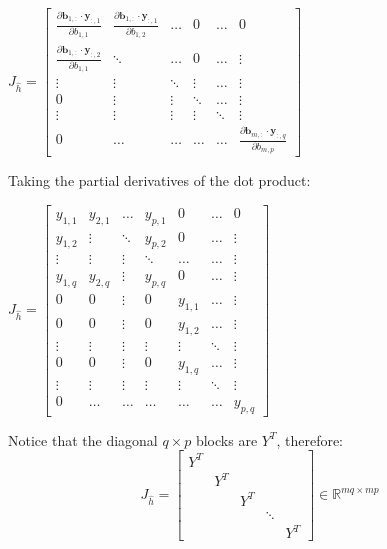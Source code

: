 \documentclass{article}
\begin{document}
\begin{center}$
J_{\widehat{h}}
=
\begin{bmatrix}
    \frac{\partial \mathbf{b}_{1,:} \cdot \mathbf{y}_{:,1} }{\partial b_{1,1}} & \frac{\partial \mathbf{b}_{1,:} \cdot \mathbf{y}_{:,1} }{\partial b_{1,2}} &\hdots &  0 &\hdots & 0 \\
    \frac{\partial \mathbf{b}_{1,:} \cdot \mathbf{y}_{:,2} }{\partial b_{1,1}}  & \ddots &\hdots & 0 & \hdots& \vdots \\
    \vdots & \vdots & \ddots & \vdots & \hdots & \vdots\\
    0 & \vdots & \vdots & \ddots & \hdots & \vdots\\
    \vdots & \vdots & \vdots & \vdots & \ddots & \vdots\\
    0  & \hdots & \hdots & \hdots & \hdots & \frac{\partial \mathbf{b}_{m,:} \cdot \mathbf{y}_{:,q} }{\partial b_{m,p}}
\end{bmatrix}
$
\end{center}
Taking the partial derivatives of the dot product:
\begin{center}$
J_{\widehat{h}}
=
\begin{bmatrix}
    y_{1,1} & y_{2,1} &\hdots & y_{p,1}&  0 &\hdots & 0 \\
    y_{1,2}  & \vdots &\ddots  &y_{p,2}&0& \hdots& \vdots \\
    \vdots &\vdots& \vdots & \ddots & \hdots & \hdots & \vdots\\
    y_{1,q} & y_{2,q} & \vdots & y_{p,q}& 0 & \hdots & \vdots\\
    0& 0 & \vdots & 0& y_{1,1} & \hdots & \vdots\\
    0 & 0 & \vdots & 0& y_{1,2} & \hdots & \vdots\\
    \vdots&\vdots & \vdots & \vdots & \vdots & \ddots & \vdots\\
    0 & 0 & \vdots & 0& y_{1,q} & \hdots & \vdots\\
    \vdots&\vdots & \vdots & \vdots & \vdots & \ddots & \vdots\\
    0  &\hdots& \hdots & \hdots & \hdots & \hdots & y_{p,q}
\end{bmatrix}
$
\end{center}
Notice that the diagonal $q\times p$ blocks are $Y^T$, therefore:
\begin{equation}
J_{\widehat{h}}
=
\begin{bmatrix}
    Y^T \\ & Y^T \\ & & Y^T \\ & & & \ddots \\ & & & & Y^T
\end{bmatrix} \in \mathbb{R}^{mq \times mp}
\end{equation}
\end{document}
